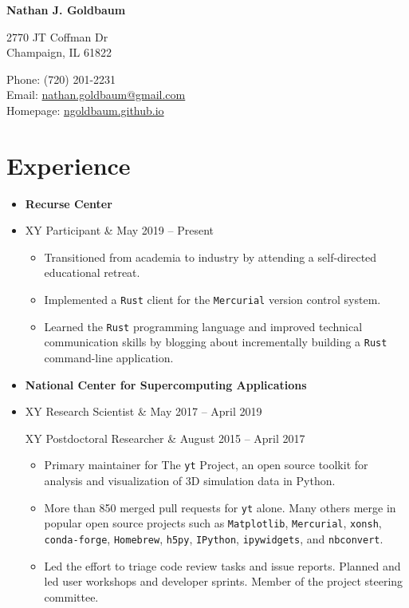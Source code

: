 \documentclass[10pt,letterpaper]{article}
\def\name{Nathan J. Goldbaum}
\newcommand{\textline}[2]{
  \begin{tabularx}{\textwidth}{XY}
  #1 & #2
  \end{tabularx}
}
\begin{document}
{\huge \bf \name}


\bigskip

\begin{minipage}[t]{0.6\textwidth}
  2770 JT Coffman Dr \\
  Champaign, IL 61822
\end{minipage}
\begin{minipage}[t]{0.4\textwidth}
  Phone: (720) 201-2231 \\  %
  Email: \href{mailto:nathan.goldbaum@gmail.com}{nathan.goldbaum@gmail.com} \\
  Homepage: \href{ngoldbaum.github.io}{ngoldbaum.github.io}
\end{minipage}

\section*{Experience}
\begin{itemize}
  \item [] {\bf Recurse Center}
  \item [] \textline{Participant}{May 2019 -- Present}
    \begin{itemize}
    \item Transitioned from academia to industry by attending a
      self-directed educational retreat.
    \item Implemented a \texttt{Rust} client for the \texttt{Mercurial} version
      control system.
    \item Learned the \texttt{Rust} programming language and improved technical
      communication skills by blogging about incrementally building a
      \texttt{Rust} command-line application.
    \end{itemize}    
    
  \item [] {\bf National Center for Supercomputing Applications}
  \item[] \textline{Research Scientist}{May 2017 -- April 2019} %
    \textline{Postdoctoral Researcher}{August 2015 -- April 2017} %
    \begin{itemize}
    \item Primary maintainer for The \texttt{yt} Project, an open source toolkit
      for analysis and visualization of 3D simulation data in Python.
    \item More than 850 merged pull requests for \texttt{yt} alone. Many
      others merge in popular open source projects such as
      \texttt{Matplotlib}, \texttt{Mercurial}, \texttt{xonsh},
      \texttt{conda-forge}, \texttt{Homebrew}, \texttt{h5py}, \texttt{IPython},
      \texttt{ipywidgets}, and \texttt{nbconvert}.
    \item Led the effort to triage code review tasks and issue reports. Planned
      and led user workshops and developer sprints. Member of the project
      steering committee.
    \end{itemize}
\end{itemize}
\end{document}
